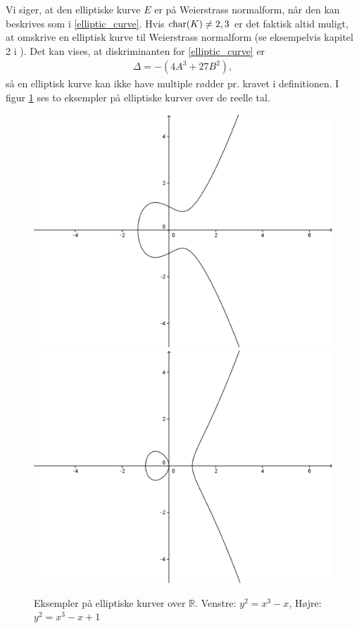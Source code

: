 Vi siger, at den elliptiske kurve $E$ er på Weierstrass normalform, når den kan beskrives som i \eqref{elliptic_curve}. Hvis $\text{char} (K) \neq 2, 3$ er det faktisk altid muligt, at omskrive en elliptisk kurve til Weierstrass normalform (se eksempelvis kapitel 2 i \cite{Washington}). Det kan vises, at diskriminanten for \eqref{elliptic_curve} er \begin{align*}
	\Delta = -(4A^3 + 27B^2),
\end{align*}
så en elliptisk kurve kan ikke have multiple rødder pr. kravet i definitionen. I figur \ref{figure_elliptic_curves} ses to eksempler på elliptiske kurver over de reelle tal.
\begin{figure}
\label{figure_elliptic_curves}
\centering
\includegraphics[scale=0.2]{elliptic_1}
\includegraphics[scale=0.2]{elliptic_2}
\caption{Eksempler på elliptiske kurver over $\mathbb{R}$. Venstre: $y^2 = x^3 - x$, Højre: $y^2 = x^3 -x + 1$}
\end{figure}
